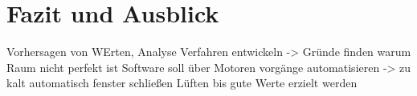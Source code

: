 \chapter{Fazit und Ausblick}

Vorhersagen von WErten,
Analyse Verfahren entwickeln -> Gründe finden warum Raum nicht perfekt ist
Software soll über Motoren vorgänge automatisieren -> zu kalt automatisch fenster schließen
Lüften bis gute Werte erzielt werden
